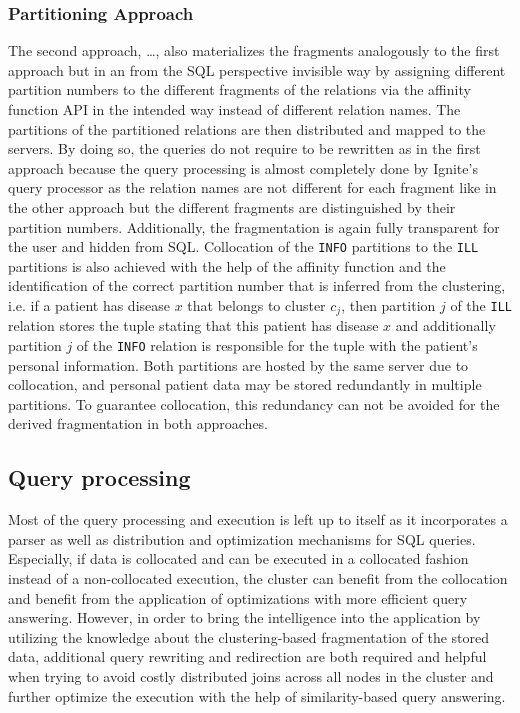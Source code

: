 \subsubsection{Partitioning Approach}

The second approach, \dots, also materializes the fragments analogously to the first approach but in an from the SQL perspective invisible way by assigning
different partition numbers to the different fragments of the relations via the affinity function API in the intended way instead of different relation names.
The partitions of the partitioned relations are then distributed and mapped to the servers. By doing so, the queries do not require to be rewritten as in the
first approach because the query processing is almost completely done by Ignite's query processor as the relation names are not different for each fragment 
like in the other approach but the different fragments are distinguished by their partition numbers. Additionally, the fragmentation is again fully transparent 
for the user and hidden from SQL. Collocation of the \verb!INFO! partitions to the \verb!ILL! partitions is also achieved with the help of the affinity function
and the identification of the correct partition number that is inferred from the clustering, i.e. if a patient has disease $x$ that belongs to cluster $c_j$, 
then partition $j$ of the \verb!ILL! relation stores the tuple stating that this patient has disease $x$ and additionally partition $j$ of the \verb!INFO! 
relation is responsible for the tuple with the patient's personal information. Both partitions are hosted by the same server due to collocation, and personal
patient data may be stored redundantly in multiple partitions. To guarantee collocation, this redundancy can not be avoided for the derived fragmentation in 
both approaches.



\subsection{Query processing}
\label{sec:impl_qpro}

Most of the query processing and execution is left up to  itself as it incorporates a parser as well as distribution and optimization
mechanisms for SQL queries. Especially, if data is collocated and can be executed in a collocated fashion instead of a non-collocated execution, the cluster 
can benefit from the collocation and benefit from the application of optimizations with more efficient query answering. However, in order to bring the
intelligence into the application by utilizing the knowledge about the clustering-based fragmentation of the stored data, additional query rewriting and
redirection are both required and helpful when trying to avoid costly distributed joins across all nodes in the cluster and further optimize the execution 
with the help of similarity-based query answering.

